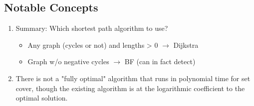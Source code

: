 \subsection{Notable Concepts}

\begin{enumerate}
    \item Summary: Which shortest path algorithm to use?
        \begin{itemize}
            \item Any graph (cycles or not) and lengths > 0 $\rightarrow$ Dijkstra
            \item Graph w/o negative cycles $\rightarrow$ BF (can in fact detect)
        \end{itemize}
    \item There is not a "fully optimal" algorithm that runs in polynomial time for set cover, though the existing algorithm is at the logarithmic coefficient to the optimal solution.
\end{enumerate}


